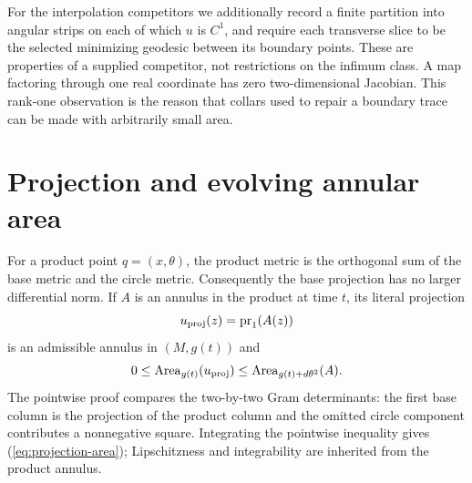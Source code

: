 \begin{definition}\label{def:annular-geodesic}
For the interpolation competitors we additionally record a finite partition
into angular strips on each of which $u$ is $C^1$, and require each
transverse slice to be the selected minimizing geodesic between its boundary
points.  These are properties of a supplied competitor, not restrictions
on the infimum class.  A map factoring through one real
coordinate has zero two-dimensional Jacobian.  This rank-one observation is
the reason that collars used to repair a boundary trace can be made with
arbitrarily small area.
\end{definition}

\section{Projection and evolving annular area}
\label{sec:annular-evolution}

\begin{lemma}\label{lem:annular-projection}
For a product point $q=(x,\theta)$, the product metric is the orthogonal sum
of the base metric and the circle metric.  Consequently the base projection
has no larger differential norm.  If $A$ is an annulus in the product at
time $t$, its literal projection
\[
 u_{\rm proj}(z)=\operatorname{pr}_1(A(z))
\]
is an admissible annulus in $(M,g(t))$ and
\begin{equation}
 0\le \operatorname{Area}_{g(t)}(u_{\rm proj})
 \le \operatorname{Area}_{g(t)+d\theta^2}(A).
 \label{eq:projection-area}
\end{equation}
The pointwise proof compares the two-by-two Gram determinants: the first
base column is the projection of the product column and the omitted circle
component contributes a nonnegative square.  Integrating the pointwise
inequality gives (\ref{eq:projection-area}); Lipschitzness and integrability
are inherited from the product annulus.
\end{lemma}

